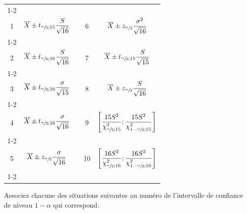 \begin{questions}
\begin{center}
\begin{tabular}{|c|c|c|c|c|}
	\cline{1-2}\cline{4-5}
	&&&&\\[-3mm]
	1 &  $\displaystyle \overline {X}\pm t_{\sfrac{\alpha}{2};15}\frac{S}{\sqrt{16}}$
	 & \hspace{0.3cm} &
	 6 &  $\displaystyle \overline {X}\pm z_{\sfrac{\alpha}{2}}\frac{\sigma^2}{\sqrt{16}}$
	\\[4mm]
	\cline{1-2}\cline{4-5}
	&&&&\\[-3mm]
	 2 & $\displaystyle \overline {X}\pm t_{\sfrac{\alpha}{2};16}\frac{S}{\sqrt{16}}$
	&  &
	 7 & $\displaystyle \overline {X}\pm t_{\sfrac{\alpha}{2};15}\frac{S}{\sqrt{15}}$ 
	\\[4mm]
	\cline{1-2}\cline{4-5}
	&&&&\\[-3mm]
	 3 & $\displaystyle \overline {X}\pm t_{\sfrac{\alpha}{2};16}\frac{\sigma}{\sqrt{15}}$
	 &  &
	  8 & $\displaystyle \overline {X}\pm z_{\sfrac{\alpha}{2}}\frac{S}{\sqrt{16}}$
	 \\[4mm]
	 \cline{1-2}\cline{4-5}
	 &&&&\\[-3mm]
	   4 & $\displaystyle \overline {X}\pm t_{\sfrac{\alpha}{2};16}\frac{\sigma}{\sqrt{16}}$
	 &  &
	  9 & $\displaystyle \left[\frac{15S^2}{\chi_{\sfrac{\alpha}{2};15}^2};\frac{15S^2}{\chi_{1-\sfrac{\alpha}{2};15}^2}\right]$
	 \\[5mm]
	 \cline{1-2}\cline{4-5}
	 &&&&\\[-3mm]
	  5 & $\displaystyle \overline {X}\pm z_{\sfrac{\alpha}{2}}\frac{\sigma}{\sqrt{16}}$
	 &  &
	  10 & $\displaystyle \left[\frac{16S^2}{\chi_{\sfrac{\alpha}{2};16}^2};\frac{16S^2}{\chi_{1-\sfrac{\alpha}{2};16}^2}\right]$
	 \\[5mm]
	 \cline{1-2}\cline{4-5}

	
\end{tabular}

\end{center}

Associez chacune des situations suivantes au numéro de l'intervalle de confiance de niveau $1-\alpha$ qui correspond.


\end{questions}
